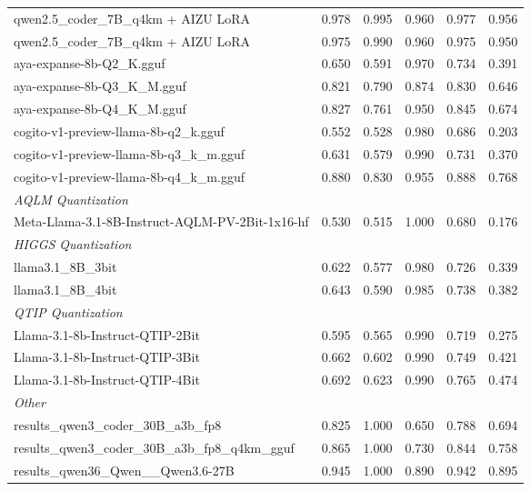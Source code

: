 \begin{table}[htbp]
{\begin{tabular}{lrrrrr}
    qwen2.5\_coder\_7B\_q4km + AIZU LoRA & 0.978 & 0.995 & 0.960 & 0.977 & \cellcolor{green!40}0.956 \\
    qwen2.5\_coder\_7B\_q4km + AIZU LoRA & 0.975 & 0.990 & 0.960 & 0.975 & \cellcolor{green!10}0.950 \\
    aya-expanse-8b-Q2\_K.gguf & 0.650 & 0.591 & 0.970 & 0.734 & 0.391 \\
    aya-expanse-8b-Q3\_K\_M.gguf & 0.821 & 0.790 & 0.874 & 0.830 & 0.646 \\
    aya-expanse-8b-Q4\_K\_M.gguf & 0.827 & 0.761 & 0.950 & 0.845 & 0.674 \\
    cogito-v1-preview-llama-8b-q2\_k.gguf & 0.552 & 0.528 & 0.980 & 0.686 & 0.203 \\
    cogito-v1-preview-llama-8b-q3\_k\_m.gguf & 0.631 & 0.579 & 0.990 & 0.731 & 0.370 \\
    cogito-v1-preview-llama-8b-q4\_k\_m.gguf & 0.880 & 0.830 & 0.955 & 0.888 & 0.768 \\
    \midrule
    \multicolumn{6}{l}{\textit{AQLM Quantization}} \\
    \midrule
    Meta-Llama-3.1-8B-Instruct-AQLM-PV-2Bit-1x16-hf & 0.530 & 0.515 & 1.000 & 0.680 & 0.176 \\
    \midrule
    \multicolumn{6}{l}{\textit{HIGGS Quantization}} \\
    \midrule
    llama3.1\_8B\_3bit & 0.622 & 0.577 & 0.980 & 0.726 & 0.339 \\
    llama3.1\_8B\_4bit & 0.643 & 0.590 & 0.985 & 0.738 & 0.382 \\
    \midrule
    \multicolumn{6}{l}{\textit{QTIP Quantization}} \\
    \midrule
    Llama-3.1-8b-Instruct-QTIP-2Bit & 0.595 & 0.565 & 0.990 & 0.719 & 0.275 \\
    Llama-3.1-8b-Instruct-QTIP-3Bit & 0.662 & 0.602 & 0.990 & 0.749 & 0.421 \\
    Llama-3.1-8b-Instruct-QTIP-4Bit & 0.692 & 0.623 & 0.990 & 0.765 & 0.474 \\
    \midrule
    \multicolumn{6}{l}{\textit{Other}} \\
    \midrule
    results\_qwen3\_coder\_30B\_a3b\_fp8 & 0.825 & 1.000 & 0.650 & 0.788 & 0.694 \\
    results\_qwen3\_coder\_30B\_a3b\_fp8\_q4km\_gguf & 0.865 & 1.000 & 0.730 & 0.844 & 0.758 \\
    results\_qwen36\_Qwen\_\_Qwen3.6-27B & 0.945 & 1.000 & 0.890 & 0.942 & 0.895 \\
    \bottomrule
  \end{tabular}
  }
\end{table}

